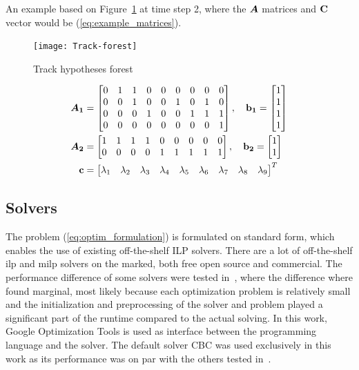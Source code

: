 An example based on Figure~\ref{fig:hyp_forest} at time step 2, where the \(\bm{A}\) matrices and \(\boldsymbol{\mathbf{C}}\) vector would be (\ref{eq:example_matrices}).
\begin{figure}[H]
\centering
\texttt{[image: Track-forest]}
\caption{Track hypotheses forest}\label{fig:hyp_forest}
\end{figure}

\begin{equation}
\begin{split}
\bm{A_1} &=\begin{bmatrix}
		0 & 1 & 1 & 0 & 0 & 0 & 0 & 0 & 0 \\
       	0 & 0 & 1 & 0 & 0 & 1 & 0 & 1 & 0 \\
       	0 & 0 & 0 & 1 & 0 & 0 & 1 & 1 & 1 \\
       	0 & 0 & 0 & 0 & 0 & 0 & 0 & 0 & 1 \\
     	\end{bmatrix},\quad
\boldsymbol{\mathbf{b_1}} = 	\begin{bmatrix}
			1 \\ 1  \\ 1 \\ 1
			\end{bmatrix} \\
\bm{A_2} &=\begin{bmatrix}
		1 & 1 & 1 & 1 & 0 & 0 & 0 & 0 & 0 \\
       	0 & 0 & 0 & 0 & 1 & 1 & 1 & 1 & 1 \\
     	\end{bmatrix} ,\quad
\boldsymbol{\mathbf{b_2}} = 	\begin{bmatrix}
			1 \\ 1
			\end{bmatrix} \\
\boldsymbol{\mathbf{c}} &=\begin{bmatrix}
		\lambda_1 & \lambda_2 & \lambda_3 & \lambda_4 & \lambda_5 & \lambda_6 & \lambda_7 & \lambda_8 & \lambda_9
		\end{bmatrix}^T \\
\end{split}
\label{eq:example_matrices}
\end{equation}

\subsection{Solvers}
The problem (\ref{eq:optim_formulation}) is formulated on standard form, which enables the use of existing off-the-shelf ILP solvers. There are a lot of off-the-shelf \gls{ilp} and \gls{milp} solvers on the marked, both free open source and commercial. The performance difference of some solvers were tested in~\cite{Liland_2017}, where the difference where found marginal,  most likely because each optimization problem is relatively small and the initialization and preprocessing of the solver and problem played a significant part of the runtime compared to the actual solving. In this work, Google Optimization Tools is used as interface between the programming language and the solver. The default solver CBC was used exclusively in this work as its performance was on par with the others tested in~\cite{Liland_2017}. 


